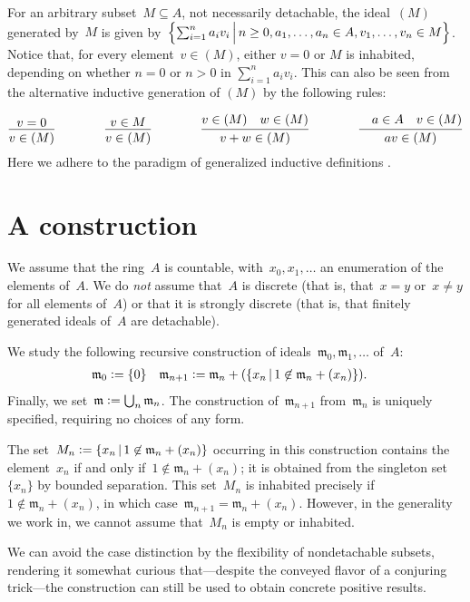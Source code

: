 \documentclass[envcountsect,envcountsame,runningheads]{llncs}
\newcommand{\mmm}{\mathfrak{m}}
\newcommand{\defeq}{\vcentcolon=}
\renewcommand{\_}{\mathpunct{.}\,}
\begin{document}
For an arbitrary subset~$M \subseteq A$, not necessarily
detachable, the ideal~$(M)$ generated by~$M$ is given by~$\Bigl\{ \sum_{i=1}^n
a_i v_i \,\Big|\, n \geq 0, a_1,\ldots,a_n \in A, v_1,\ldots,v_n \in M \Bigr\}$.
Notice that, for every element~$v \in (M)$, either $v = 0$ or $M$ is inhabited, depending on whether
$n=0$ or $n>0$ in $\sum_{i=1}^n a_i v_i$. This can also be seen from the alternative inductive
generation of $(M)$ by the following rules:\par
{\vspace*{-0.8em}\small\[
\infer{v \in (M)}{v=0}
\qquad\qquad
\infer{v \in (M)}{v \in M}
\qquad\qquad
\infer{v+w \in (M)}{v \in (M)\quad w \in (M)}
\qquad\qquad
\infer{av \in (M)}{\quad a\in A \quad v \in (M)}
\]}%
\noindent Here we adhere to the paradigm of generalized inductive definitions
\cite{aczel-rathjen:notes,aczel-rathjen:cstdraft,rathjen:genind}.


\section{A construction}
\label{sect:constr}

We assume that the ring~$A$ is countable, with~$x_0, x_1, \ldots$ an
enumeration of the elements of~$A$. We do \emph{not} assume that~$A$ is
discrete (that is, that~$x = y$ or~$x \neq y$ for all elements of~$A$) or that
it is strongly discrete (that is, that finitely generated
ideals of~$A$ are detachable).

We study the following recursive construction of ideals~$\mmm_0, \mmm_1,
\ldots$ of~$A$:
\begin{align*}
  \mmm_0 &\defeq \{0\} &
  \mmm_{n+1} &\defeq \mmm_n + (\{ x_n \,|\, 1 \not\in \mmm_n + (x_n) \}).
\end{align*}
Finally, we set~$\mmm \defeq \bigcup_n \mmm_n$. The construction
of~$\mmm_{n+1}$ from~$\mmm_n$ is uniquely specified, requiring no choices of
any form.

The set~$M_n \defeq \{ x_n \,|\, 1 \not\in \mmm_n + (x_n) \}$ occurring in this
construction contains the element~$x_n$ if and only if~$1 \not\in \mmm_n +
(x_n)$; it is obtained from the singleton set~$\{x_n\}$ by bounded separation.
This set~$M_n$ is inhabited precisely if~$1 \not\in \mmm_n + (x_n)$, in which case~$\mmm_{n+1} = \mmm_n + (x_n)$.
However, in the generality we work in, we cannot assume that~$M_n$ is empty or
inhabited.

We can avoid the case distinction by the flexibility of nondetachable
subsets, rendering it somewhat curious that---despite the conveyed flavor of a
conjuring trick---the construction can still be used to obtain concrete
positive results.
\end{document}
